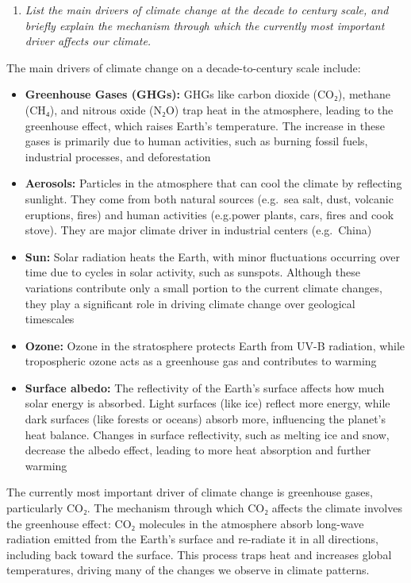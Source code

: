 \documentclass[
]{article}
\providecommand{\tightlist}{%
  \setlength{\itemsep}{0pt}\setlength{\parskip}{0pt}}
\begin{document}
\begin{enumerate}
\def\labelenumi{\arabic{enumi}.}
\tightlist
\item
  \emph{List the main drivers of climate change at the decade to century scale, and briefly explain the mechanism through which the currently most important driver affects our climate.}
\end{enumerate}

The main drivers of climate change on a decade-to-century scale include:

\begin{itemize}
\item
  \textbf{Greenhouse Gases (GHGs):} GHGs like carbon dioxide (CO₂), methane (CH₄), and nitrous oxide (N₂O) trap heat in the atmosphere, leading to the greenhouse effect, which raises Earth's temperature. The increase in these gases is primarily due to human activities, such as burning fossil fuels, industrial processes, and deforestation
\item
  \textbf{Aerosols:} Particles in the atmosphere that can cool the climate by reflecting sunlight. They come from both natural sources (e.g.~sea salt, dust, volcanic eruptions, fires) and human activities (e.g.power plants, cars, fires and cook stove). They are major climate driver in industrial centers (e.g.~China)
\item
  \textbf{Sun:} Solar radiation heats the Earth, with minor fluctuations occurring over time due to cycles in solar activity, such as sunspots. Although these variations contribute only a small portion to the current climate changes, they play a significant role in driving climate change over geological timescales
\item
  \textbf{Ozone:} Ozone in the stratosphere protects Earth from UV-B radiation, while tropospheric ozone acts as a greenhouse gas and contributes to warming
\item
  \textbf{Surface albedo:} The reflectivity of the Earth's surface affects how much solar energy is absorbed. Light surfaces (like ice) reflect more energy, while dark surfaces (like forests or oceans) absorb more, influencing the planet's heat balance. Changes in surface reflectivity, such as melting ice and snow, decrease the albedo effect, leading to more heat absorption and further warming
\end{itemize}

The currently most important driver of climate change is greenhouse gases, particularly CO₂. The mechanism through which CO₂ affects the climate involves the greenhouse effect: CO₂ molecules in the atmosphere absorb long-wave radiation emitted from the Earth's surface and re-radiate it in all directions, including back toward the surface. This process traps heat and increases global temperatures, driving many of the changes we observe in climate patterns.
\end{document}
